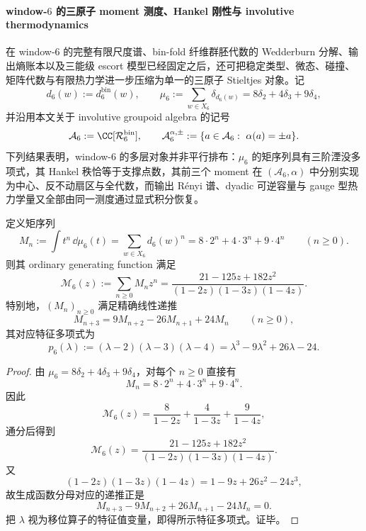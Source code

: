\paragraph{window-\texorpdfstring{$6$}{6} 的三原子 moment 测度、Hankel 刚性与 involutive thermodynamics}
在 window-\(6\) 的完整有限尺度谱、bin-fold 纤维群胚代数的 Wedderburn 分解、输出熵账本以及三能级 escort 模型已经固定之后，还可把稳定类型、微态、碰撞、矩阵代数与有限热力学进一步压缩为单一的三原子 Stieltjes 对象。记
\[
d_6(w):=d_6^{\mathrm{bin}}(w),
\qquad
\mu_6:=\sum_{w\in X_6}\delta_{d_6(w)}=8\delta_2+4\delta_3+9\delta_4,
\]
并沿用本文关于 involutive groupoid algebra 的记号
\[
\mathcal A_6:=\CC[\mathcal R_6^{\mathrm{bin}}],
\qquad
\mathcal A_6^{\alpha,\pm}:=\{a\in \mathcal A_6:\ \alpha(a)=\pm a\}.
\]
下列结果表明，window-\(6\) 的多层对象并非平行排布：\(\mu_6\) 的矩序列具有三阶湮没多项式，其 Hankel 秩恰等于支撑点数，其前三个 moment 在 \((\mathcal A_6,\alpha)\) 中分别实现为中心、反不动扇区与全代数，而输出 Rényi 谱、dyadic 可逆容量与 gauge 型热力学量又全部由同一测度通过显式积分恢复。

\begin{theorem}\label{thm:xi-time-part9z-window6-threeatom-moment-ogf}
定义矩序列
\[
M_n:=\int t^n\,\dd\mu_6(t)
=
\sum_{w\in X_6}d_6(w)^n
=
8\cdot 2^n+4\cdot 3^n+9\cdot 4^n
\qquad (n\ge 0).
\]
则其 ordinary generating function 满足
\[
\mathcal M_6(z):=\sum_{n\ge 0}M_n z^n
=
\frac{21-125z+182z^2}{(1-2z)(1-3z)(1-4z)}.
\]
特别地，\((M_n)_{n\ge 0}\) 满足精确线性递推
\[
M_{n+3}=9M_{n+2}-26M_{n+1}+24M_n
\qquad (n\ge 0),
\]
其对应特征多项式为
\[
p_6(\lambda):=(\lambda-2)(\lambda-3)(\lambda-4)
=
\lambda^3-9\lambda^2+26\lambda-24.
\]
\end{theorem}
\begin{proof}
由 \(\mu_6=8\delta_2+4\delta_3+9\delta_4\)，对每个 \(n\ge 0\) 直接有
\[
M_n=8\cdot 2^n+4\cdot 3^n+9\cdot 4^n.
\]
因此
\[
\mathcal M_6(z)
=
\frac{8}{1-2z}+\frac{4}{1-3z}+\frac{9}{1-4z},
\]
通分后得到
\[
\mathcal M_6(z)
=
\frac{21-125z+182z^2}{(1-2z)(1-3z)(1-4z)}.
\]
又
\[
(1-2z)(1-3z)(1-4z)=1-9z+26z^2-24z^3,
\]
故生成函数分母对应的递推正是
\[
M_{n+3}-9M_{n+2}+26M_{n+1}-24M_n=0.
\]
把 \(\lambda\) 视为移位算子的特征值变量，即得所示特征多项式。证毕。
\end{proof}

